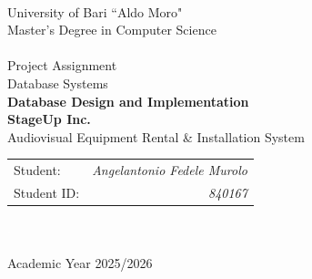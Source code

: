 \begin{titlepage}
    \begin{center}
        \\
        \vspace{0.5cm}
    {\large University of Bari ``Aldo Moro"}\\
    \vspace{0.2cm}
        \vspace{0.5cm}
        {\large Master's Degree in Computer Science}\\
        \hrulefill \\
        \vspace{0.5cm}
        {\large Project Assignment}\\
        \vspace{0.5cm}
        {\large Database Systems}\\
        \vspace{0.5cm}
        {\LARGE \textbf{Database Design and Implementation}}\\
        \vspace{0.4cm}
        {\Large \textbf{StageUp Inc.}}\\
        {\normalsize Audiovisual Equipment Rental \& Installation System}\\

        \vfill
        \begin{tabularx}{\textwidth}{@{}Xr@{}}
          {\large Student:} & {\large \textit{Angelantonio Fedele Murolo}} \\
          {\large Student ID:} & {\large \textit{840167}} \\
        \end{tabularx}
        \textcolor{white}{.}\\
        \vspace{0.5cm}
        \hrulefill \\
        {\large Academic Year 2025/2026}
    \end{center}
\end{titlepage}
